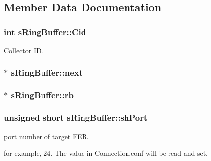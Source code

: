 \subsection{Member Data Documentation}
\hypertarget{structs_ring_buffer_ac518da2b168acdf6876786ad38465d3d}{}
\subsubsection[{Cid}]{\setlength{\rightskip}{0pt plus 5cm}int s\+Ring\+Buffer\+::\+Cid}\label{structs_ring_buffer_ac518da2b168acdf6876786ad38465d3d}


Collector I\+D. 

\hypertarget{structs_ring_buffer_a3685b679b0732b84bbccb1f467638ea9}{}
\subsubsection[{next}]{$\ast$ s\+Ring\+Buffer\+::next}\label{structs_ring_buffer_a3685b679b0732b84bbccb1f467638ea9}
\hypertarget{structs_ring_buffer_a02e62b51275c98f3e74e6b04d9f3ecb6}{}
\subsubsection[{rb}]{$\ast$ s\+Ring\+Buffer\+::rb}\label{structs_ring_buffer_a02e62b51275c98f3e74e6b04d9f3ecb6}
\hypertarget{structs_ring_buffer_a38ec2d7373bbb5e89f7282c3de49e564}{}
\subsubsection[{sh\+Port}]{\setlength{\rightskip}{0pt plus 5cm}unsigned short s\+Ring\+Buffer\+::sh\+Port}\label{structs_ring_buffer_a38ec2d7373bbb5e89f7282c3de49e564}


port number of target F\+E\+B. 

for example, 24. The value in Connection.\+conf will be read and set. \hypertarget{structs_ring_buffer_a86973832a168fb3fb15847da4407e590}{}
